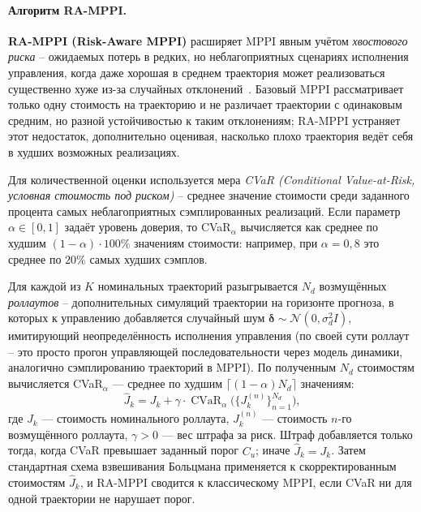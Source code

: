 \documentclass[a4paper,12pt]{extarticle}
\begin{document}
    \paragraph{Алгоритм RA-MPPI.}

    \textbf{RA-MPPI (Risk-Aware MPPI)} расширяет MPPI явным учётом \emph{хвостового риска} -- ожидаемых потерь в редких, но неблагоприятных сценариях исполнения управления, когда даже хорошая в среднем траектория может реализоваться существенно хуже из-за случайных отклонений~\cite{ra_mppi}. Базовый MPPI рассматривает только одну стоимость на траекторию и не различает траектории с одинаковым средним, но разной устойчивостью к таким отклонениям; RA-MPPI устраняет этот недостаток, дополнительно оценивая, насколько плохо траектория ведёт себя в худших возможных реализациях.

    Для количественной оценки используется мера \emph{CVaR (Conditional Value-at-Risk, условная стоимость под риском)} -- среднее значение стоимости среди заданного процента самых неблагоприятных сэмплированных реализаций. Если параметр $\alpha \in [0, 1]$ задаёт уровень доверия, то CVaR$_\alpha$ вычисляется как среднее по худшим $(1-\alpha) \cdot 100\%$ значениям стоимости: например, при $\alpha = 0{,}8$ это среднее по $20\%$ самых худших сэмплов.

    Для каждой из $K$ номинальных траекторий разыгрывается $N_d$ возмущённых \emph{роллаутов} -- дополнительных симуляций траектории на горизонте прогноза, в которых к управлению добавляется случайный шум $\boldsymbol{\delta} \sim \mathcal{N}(0, \sigma_d^2 I)$, имитирующий неопределённость исполнения управления (по своей сути роллаут -- это просто прогон управляющей последовательности через модель динамики, аналогично сэмплированию траекторий в MPPI).
    По полученным $N_d$ стоимостям вычисляется CVaR$_\alpha$ --- среднее по худшим
    $\lceil (1-\alpha) N_d \rceil$ значениям:
    $$
    \widehat{J}_k = J_k + \gamma \cdot
    \operatorname{CVaR}_{\alpha}\!\bigl(\{J_k^{(n)}\}_{n=1}^{N_d}\bigr),
    $$
    где $J_k$ --- стоимость номинального роллаута, $J_k^{(n)}$ --- стоимость $n$-го возмущённого роллаута,
    $\gamma > 0$ --- вес штрафа за риск.
    Штраф добавляется только тогда, когда CVaR превышает заданный порог $C_u$;
    иначе $\widehat{J}_k = J_k$.
    Затем стандартная схема взвешивания Больцмана применяется к скорректированным стоимостям $\widehat{J}_k$,
    и RA-MPPI сводится к классическому MPPI, если CVaR ни для одной траектории не нарушает порог.
\end{document}
